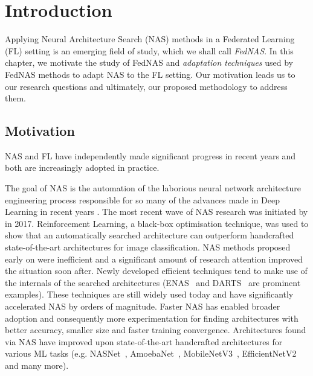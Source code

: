 \chapter{Introduction}\label{chapter:introduction}

Applying Neural Architecture Search (NAS) methods in a Federated Learning (FL) setting is an emerging field of study, which we shall call \textit{FedNAS}. In this chapter, we motivate the study of FedNAS and \textit{adaptation techniques} used by FedNAS methods to adapt NAS to the FL setting. Our motivation leads us to our research questions and ultimately, our proposed methodology to address them.

\section{Motivation}

NAS and FL have independently made significant progress in recent years and both are increasingly adopted in practice. 

The goal of NAS is the automation of the laborious neural network architecture engineering process responsible for so many of the advances made in Deep Learning in recent years \cite{nas_survey_2019}. The most recent wave of NAS research was initiated by \cite{nas_with_rl_2017} in 2017. Reinforcement Learning, a black-box optimisation technique, was used to show that an automatically searched architecture can outperform handcrafted state-of-the-art architectures for image classification. NAS methods proposed early on were inefficient and a significant amount of research attention improved the situation soon after. Newly developed efficient techniques tend to make use of the internals of the searched architectures (ENAS~\cite{enas_2018} and DARTS~\cite{darts_2019} are prominent examples). These techniques are still widely used today and have significantly accelerated NAS by orders of magnitude. Faster NAS has enabled broader adoption and consequently more experimentation for finding architectures with better accuracy, smaller size and faster training convergence. Architectures found via NAS have improved upon state-of-the-art handcrafted architectures for various ML tasks (e.g. NASNet~\cite{nasnet_2018}, AmoebaNet~\cite{amoebanet_2019}, MobileNetV3~\cite{mobilenetv3_2019}, EfficientNetV2~\cite{efficientnetv2_2021} and many more).

